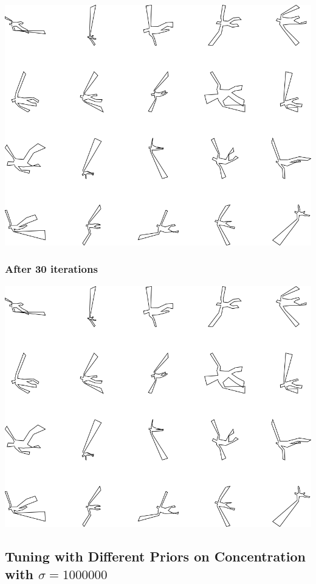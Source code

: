 \includegraphics[width=6in]{output/3.learning/concentration/concentration_psw1000_iter20_.png}
\subsubsection{After 30 iterations}

\includegraphics[width=6in]{output/3.learning/concentration/concentration_psw1000_iter30_.png}
\subsection{Tuning with Different Priors on Concentration with $\sigma=1000000$}

